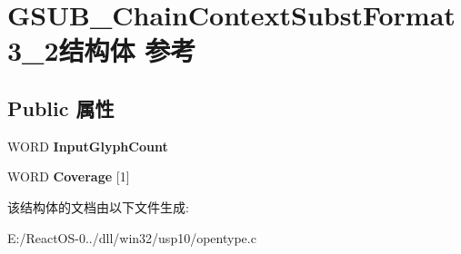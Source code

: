 \hypertarget{struct_g_s_u_b___chain_context_subst_format3__2}{}\section{G\+S\+U\+B\+\_\+\+Chain\+Context\+Subst\+Format3\+\_\+2结构体 参考}
\label{struct_g_s_u_b___chain_context_subst_format3__2}
\subsection*{Public 属性}
\begin{DoxyCompactItemize}
\item 
\mbox{\label{struct_g_s_u_b___chain_context_subst_format3__2_adf1aa72d2a086e7e77b557a8c7020dae}} 
W\+O\+RD {\bfseries Input\+Glyph\+Count}
\item 
\mbox{\label{struct_g_s_u_b___chain_context_subst_format3__2_a0f7d53c3241cec0451371f41ef109b0e}} 
W\+O\+RD {\bfseries Coverage} \mbox{[}1\mbox{]}
\end{DoxyCompactItemize}


该结构体的文档由以下文件生成\+:\begin{DoxyCompactItemize}
\item 
E\+:/\+React\+O\+S-\/0../dll/win32/usp10/opentype.\+c\end{DoxyCompactItemize}
